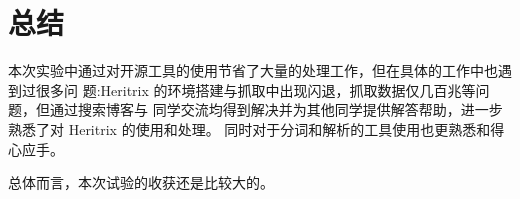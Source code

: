 \documentclass{article}
\begin{document}
	\section{总结}
		本次实验中通过对开源工具的使用节省了大量的处理工作，但在具体的工作中也遇到过很多问 题:Heritrix 的环境搭建与抓取中出现闪退，抓取数据仅几百兆等问题，但通过搜索博客与 同学交流均得到解决并为其他同学提供解答帮助，进一步熟悉了对 Heritrix 的使用和处理。 同时对于分词和解析的工具使用也更熟悉和得心应手。

		\par 
		总体而言，本次试验的收获还是比较大的。
		 
	
	
\end{document}
